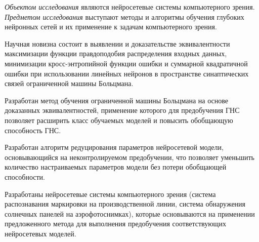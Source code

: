 \textit{Объектом исследования} являются нейросетевые системы компьютерного зрения. \textit{Предметом исследования} выступают методы и алгоритмы обучения глубоких нейронных сетей и их применение к задачам компьютерного зрения.

\vspace{3mm}
\novelty
\vspace{3mm}

Научная новизна состоит в выявлении и доказательстве эквивалентности максимизации функции правдоподобия распределения входных данных, минимизации кросс-энтропийной функции ошибки и суммарной квадратичной ошибки при использовании линейных нейронов в пространстве синаптических связей ограниченной машины Больцмана.

Разработан метод обучения ограниченной машины Больцмана на основе доказанных эквивалентностей, применение которого для предобучения ГНС позволяет расширить класс обучаемых моделей и повысить обобщающую способность ГНС.

Разработан алгоритм редуцирования параметров нейросетевой модели, основывающийся на неконтролируемом предобучении, что позволяет уменьшить количество настраиваемых параметров модели без потери обобщающей способности.

Разработаны нейросетевые системы компьютерного зрения (система распознавания маркировки на производственной линии, система обнаружения солнечных панелей на аэрофотоснимках), которые основываются на применении предложенного метода для выполнения предобучения соответствующих нейросетевых моделей.

\vspace{3mm}
\vspace{3mm}

